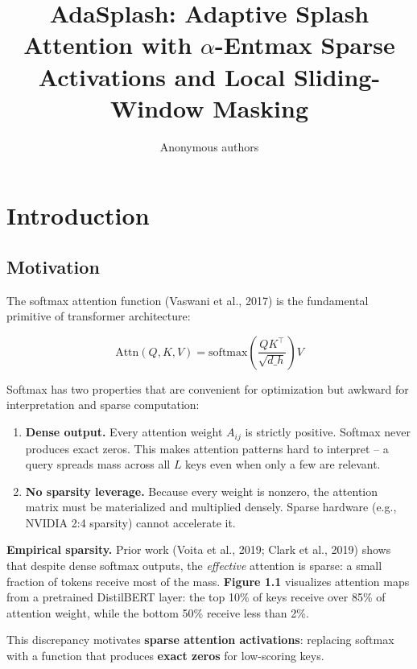 \title{\textbf{AdaSplash: Adaptive Splash Attention with $\alpha$-Entmax Sparse Activations and Local Sliding-Window Masking}}

\author{Anonymous authors}



\section{Introduction}

\subsection{Motivation}

The softmax attention function (Vaswani et al., 2017) is the fundamental 
primitive of transformer architecture:

\[
\text{Attn}(Q, K, V) = \text{softmax}\!\left(\frac{Q K^\top}{\sqrt{d\_h}}\right) V
\tag{1.1}
\]

Softmax has two properties that are convenient for optimization but awkward 
for interpretation and sparse computation:

\begin{enumerate}
\item \textbf{Dense output.} Every attention weight $A_{ij}$ is strictly positive.
  Softmax never produces exact zeros. This makes attention patterns hard
  to interpret -- a query spreads mass across all $L$ keys even when only
  a few are relevant.

\item \textbf{No sparsity leverage.} Because every weight is nonzero, the attention
  matrix must be materialized and multiplied densely. Sparse hardware
  (e.g., NVIDIA 2:4 sparsity) cannot accelerate it.

\end{enumerate}
\textbf{Empirical sparsity.} Prior work (Voita et al., 2019; Clark et al., 2019) 
shows that despite dense softmax outputs, the \textit{effective} attention is sparse: 
a small fraction of tokens receive most of the mass. \textbf{Figure 1.1} visualizes 
attention maps from a pretrained DistilBERT layer: the top 10\% of keys receive 
over 85\% of attention weight, while the bottom 50\% receive less than 2\%.

This discrepancy motivates \textbf{sparse attention activations}: replacing softmax 
with a function that produces \textbf{exact zeros} for low-scoring keys.

